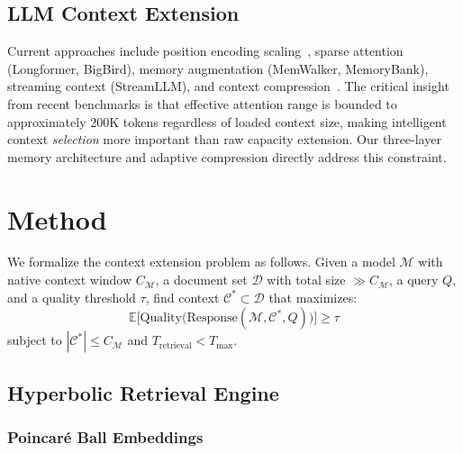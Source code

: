 \documentclass[journal]{IEEEtran}
\begin{document}
\subsection{LLM Context Extension}

Current approaches include position encoding
scaling~\cite{peng2024yarn}, sparse attention (Longformer, BigBird), memory
augmentation (MemWalker, MemoryBank), streaming context (StreamLLM), and
context
compression~\cite{jiang2024longllmlingua,li2026ata,su2025enhancingrag}.
The critical insight from recent benchmarks is that effective attention range
is bounded to approximately 200K tokens regardless of loaded context size,
making intelligent context \emph{selection} more important than raw capacity
extension.  Our three-layer memory architecture and adaptive compression
directly address this constraint.


\section{Method}
\label{sec:method}

We formalize the context extension problem as follows.
Given a model $\mathcal{M}$ with native context window $C_{\mathcal{M}}$,
a document set $\mathcal{D}$ with total size $\gg C_{\mathcal{M}}$,
a query $Q$, and a quality threshold $\tau$, find context
$\mathcal{C}^{*} \subset \mathcal{D}$ that maximizes:
\begin{equation}
  \mathbb{E}\!\bigl[\mathrm{Quality}\bigl(\mathrm{Response}(\mathcal{M},
    \mathcal{C}^{*}, Q)\bigr)\bigr] \geq \tau
  \label{eq:objective}
\end{equation}
subject to $|\mathcal{C}^{*}| \leq C_{\mathcal{M}}$ and
$T_{\mathrm{retrieval}} < T_{\max}$.

\subsection{Hyperbolic Retrieval Engine}
\label{sec:hyperbolic}

\subsubsection{Poincar\'{e} Ball Embeddings}
\end{document}
